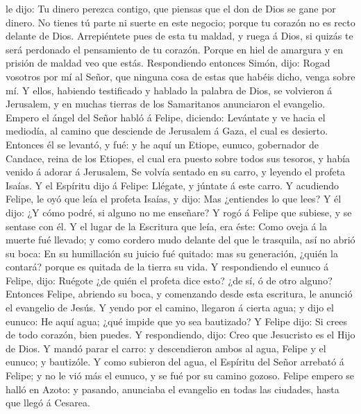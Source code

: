le dijo: Tu dinero perezca contigo, que piensas que el don de Dios se
gane por dinero.  No tienes tú parte ni suerte en este
negocio; porque tu corazón no es recto delante de Dios. 
Arrepiéntete pues de esta tu maldad, y ruega á Dios, si quizás te será
perdonado el pensamiento de tu corazón.  Porque en hiel de
amargura y en prisión de maldad veo que estás. 
Respondiendo entonces Simón, dijo: Rogad vosotros por mí al Señor, que
ninguna cosa de estas que habéis dicho, venga sobre mí.  Y
ellos, habiendo testificado y hablado la palabra de Dios, se volvieron á
Jerusalem, y en muchas tierras de los Samaritanos anunciaron el
evangelio.  Empero el ángel del Señor habló á Felipe,
diciendo: Levántate y ve hacia el mediodía, al camino que desciende de
Jerusalem á Gaza, el cual es desierto.  Entonces él se
levantó, y fué: y he aquí un Etiope, eunuco, gobernador de Candace,
reina de los Etiopes, el cual era puesto sobre todos sus tesoros, y
había venido á adorar á Jerusalem,  Se volvía sentado en su
carro, y leyendo el profeta Isaías.  Y el Espíritu dijo á
Felipe: Llégate, y júntate á este carro.  Y acudiendo
Felipe, le oyó que leía el profeta Isaías, y dijo: Mas ¿entiendes lo que
lees?  Y él dijo: ¿Y cómo podré, si alguno no me enseñare?
Y rogó á Felipe que subiese, y se sentase con él.  Y el
lugar de la Escritura que leía, era éste: Como oveja á la muerte fué
llevado; y como cordero mudo delante del que le trasquila, así no abrió
su boca:  En su humillación su juicio fué quitado: mas su
generación, ¿quién la contará? porque es quitada de la tierra su vida.
 Y respondiendo el eunuco á Felipe, dijo: Ruégote ¿de quién
el profeta dice esto? ¿de sí, ó de otro alguno?  Entonces
Felipe, abriendo su boca, y comenzando desde esta escritura, le anunció
el evangelio de Jesús.  Y yendo por el camino, llegaron á
cierta agua; y dijo el eunuco: He aquí agua; ¿qué impide que yo sea
bautizado?  Y Felipe dijo: Si crees de todo corazón, bien
puedes. Y respondiendo, dijo: Creo que Jesucristo es el Hijo de Dios.
 Y mandó parar el carro: y descendieron ambos al agua,
Felipe y el eunuco; y bautizóle.  Y como subieron del agua,
el Espíritu del Señor arrebató á Felipe; y no le vió más el eunuco, y se
fué por su camino gozoso.  Felipe empero se halló en Azoto:
y pasando, anunciaba el evangelio en todas las ciudades, hasta que llegó
á Cesarea.

